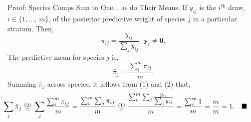 \documentclass[ xcolor = pdftex, dvipsnames, table ]{beamer}
\begin{document}
\section{}
\begin{frame}{Proof: Species Comps Sum to One... as do Their Means.}
%
If $y_{ij}$ is the $i^{\text{th}}$ draw, $i\in\{1,...,~m\}$, of the posterior predictive weight of species $j$ in a particular stratum. Then,
%
\begin{equation}
\pi_{ij} = \frac{y_{ij}}{\sum_j y_{ij}} ~~~ \bm{y}_{i}\neq \bm{0}.
\end{equation}
The predictive mean for species $j$ is,
\begin{equation}
	\hat\pi_{j} = \frac{\sum_i^m \pi_{ij}}{m}. 
\end{equation}
Summing $\hat\pi_{j}$ across species, it follows from (1) and (2) that,
\begin{equation*}
	\hspace*{-0.8cm}
	\sum_j \hat\pi_{j} ~\substack{(2)\\=}~ \sum_j\frac{\sum_i^m \pi_{ij}}{m} = \frac{\sum_i^m \sum_j \pi_{ij}}{m}~\substack{(1)\\=}~\frac{\sum_i^m \sum_j \frac{y_{ij}}{\sum_j y_{ij}}}{m} = \frac{\sum_i^m 1}{m} = \frac{m}{m}=1. ~~~\blacksquare
\end{equation*}
%
\end{frame}

%
%

%
\begin{frame}
\titlepage
\end{frame}
\usebackgroundtemplate{}
\end{document}
